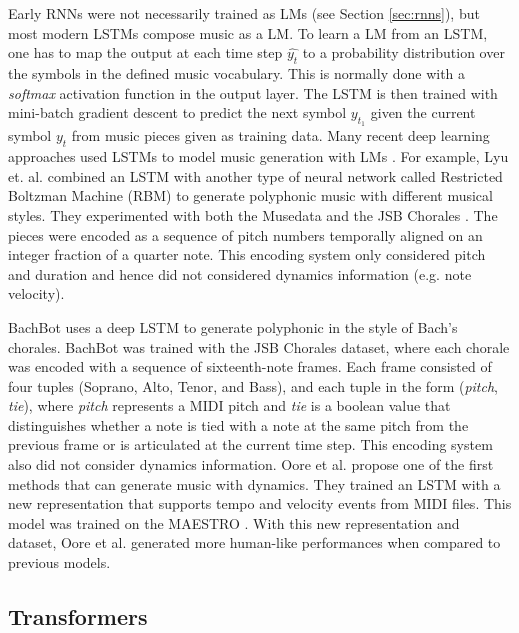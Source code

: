 
Early RNNs were not necessarily trained as LMs (see Section \ref{sec:rnns}), but most modern LSTMs compose music as a LM. To learn a LM from an LSTM, one has to map the output at each time step $\hat{y_t}$ to a probability distribution over the symbols in the defined music vocabulary. This is normally done with a \textit{softmax} activation function in the output layer. The LSTM is then trained with mini-batch gradient descent to predict the next symbol $y_{t_1}$ given the current symbol $y_t$ from music pieces given as training data. Many recent deep learning approaches used LSTMs to model music generation with LMs \cite{briot2017deep}. For example, Lyu et. al. \cite{lyu2015modelling} combined an LSTM with another type of neural network called Restricted Boltzman Machine (RBM) to generate polyphonic music with different musical styles. They experimented with both the Musedata and the JSB Chorales \cite{boulanger2012modeling}. The pieces were encoded as a sequence of pitch numbers temporally aligned on an integer fraction of a quarter note. This encoding system only considered pitch and duration and hence did not considered dynamics information (e.g. note velocity).

BachBot \cite{liang2017automatic} uses a deep LSTM to generate polyphonic in the style of Bach’s chorales. BachBot was trained with the JSB Chorales dataset, where each chorale was encoded with a sequence of sixteenth-note frames. Each frame consisted of four tuples (Soprano, Alto, Tenor, and Bass), and each tuple in the form (\textit{pitch}, \textit{tie}), where \textit{pitch} represents a MIDI pitch and \textit{tie} is a boolean value that distinguishes whether a note is tied with a note at the same pitch from the previous frame or is articulated at the current time step. This encoding system also did not consider dynamics information. Oore et al. \cite{oore2017learning} propose one of the first methods that can generate music with dynamics. They trained an LSTM with a new representation that supports tempo and velocity events from MIDI files. This model was trained on the MAESTRO \cite{hawthorne2018enabling}. With this new representation and dataset, Oore et al. \cite{oore2017learning} generated more human-like performances when compared to previous models.

\subsection{Transformers}

